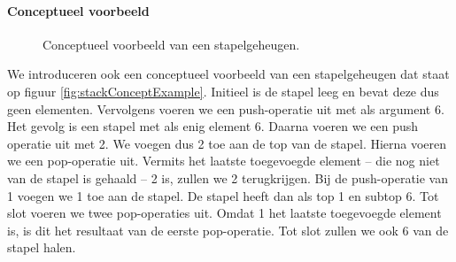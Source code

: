 \paragraph{Conceptueel voorbeeld}
\begin{figure}[hbt]
\centering
{}
\caption{Conceptueel voorbeeld van een stapelgeheugen.}
\end{figure}
We introduceren ook een conceptueel voorbeeld van een stapelgeheugen dat staat op figuur \ref{fig:stackConceptExample}. Initieel is de stapel leeg en bevat deze dus geen elementen. Vervolgens voeren we een push-operatie uit met als argument 6. Het gevolg is een stapel met als enig element 6. Daarna voeren we een push operatie uit met 2. We voegen dus 2 toe aan de top van de stapel. Hierna voeren we een pop-operatie uit. Vermits het laatste toegevoegde element -- die nog niet van de stapel is gehaald -- 2 is, zullen we 2 terugkrijgen. Bij de push-operatie van 1 voegen we 1 toe aan de stapel. De stapel heeft dan als top 1 en subtop 6. Tot slot voeren we twee pop-operaties uit. Omdat 1 het laatste toegevoegde element is, is dit het resultaat van de eerste pop-operatie. Tot slot zullen we ook 6 van de stapel halen.
